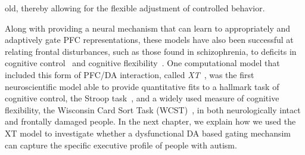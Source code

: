 old, thereby allowing for the flexible adjustment of controlled behavior.

Along with providing a neural mechanism that can learn to appropriately and adaptively gate PFC representations, these models have also been successful at relating frontal disturbances, such as those found in schizophrenia, to deficits in cognitive control~\cite{CohenJD:1992:Schizophrenia} and cognitive flexibility~\cite{BraverTS:1999:Schizophrenia,OReillyRC:2002:IDED}. One computational model that included this form of PFC/DA interaction, called \emph{XT}~\cite{RougierNP:2005:XT}, was the first neuroscientific model able to provide quantitative fits to a hallmark task of cognitive control, the Stroop task~\cite{StroopJR:1935:Interference}, and a widely used measure of cognitive flexibility, the Wisconsin Card Sort Task (WCST)~\cite{BergEA:1948:WCST}, in both neurologically intact and frontally damaged people. In the next chapter, we explain how we used the XT model to investigate whether a dysfunctional DA based gating mechansim can capture the specific executive profile of people with autism.
